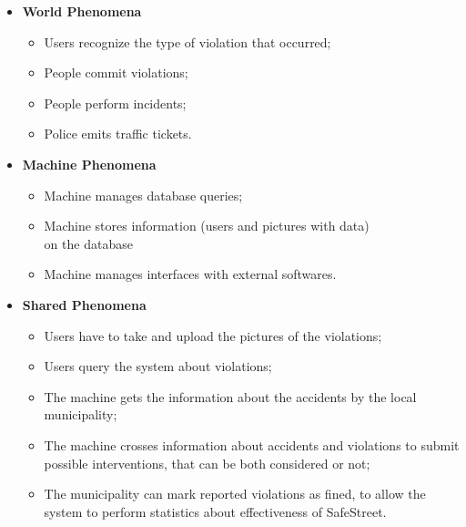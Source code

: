 \documentclass[../RASD.tex]{subfiles}
\begin{document}
        \begin{itemize}
            \item \textbf{World Phenomena}
            \begin{itemize}
                \item Users recognize the type of violation that occurred;
                \item People commit violations;
                \item People perform incidents;
                \item Police emits traffic tickets.
            \end{itemize}
            \item \textbf{Machine Phenomena}
            \begin{itemize}
                \item Machine manages database queries;
                \item Machine stores information (users and pictures with data)
                \\ on the database
                \item Machine manages interfaces with external softwares.
            \end{itemize}
            \item \textbf{Shared Phenomena}
            \begin{itemize}
                \item Users have to take and upload the pictures of the violations;
                \item Users query the system about violations;
                \item The machine gets the information about the accidents by the local municipality;
                \item The machine crosses information about accidents and violations to submit possible interventions, that can be both considered or not;
                \item The municipality can mark reported violations as fined, to allow the system to perform statistics about effectiveness of SafeStreet.
            \end{itemize}
        \end{itemize}
\end{document}
